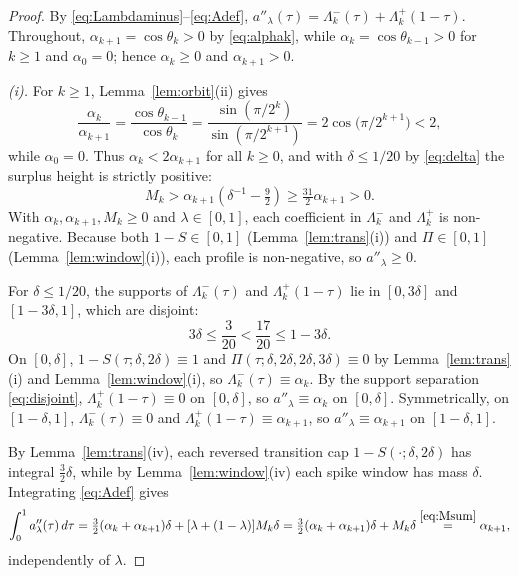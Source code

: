 \documentclass[11pt]{article}
\begin{document}
\begin{proof}
By \eqref{eq:Lambdaminus}--\eqref{eq:Adef}, $a''_\lambda(\tau)=\Lambda_k^-(\tau) + \Lambda_k^+(1-\tau)$. Throughout, $\alpha_{k+1}=\cos\theta_k>0$ by \eqref{eq:alphak}, while $\alpha_k=\cos\theta_{k-1}>0$ for $k\ge1$ and $\alpha_0=0$; hence $\alpha_k\ge0$ and $\alpha_{k+1}>0$.

\emph{(i).} For $k\ge1$, Lemma~\ref{lem:orbit}(ii) gives
\begin{equation}
\label{eq:rk}
\frac{\alpha_k}{\alpha_{k+1}} = \frac{\cos\theta_{k-1}}{\cos\theta_k}
= \frac{\sin(\pi/2^k)}{\sin(\pi/2^{k+1})}
= 2\cos\bigl(\pi/2^{k+1}\bigr) < 2,
\end{equation}
while $\alpha_0=0$. Thus $\alpha_k<2\alpha_{k+1}$ for all $k\ge0$, and with $\delta \le 1/20$ by \eqref{eq:delta} the surplus height is strictly positive:
\[
M_k > \alpha_{k+1}(\delta^{-1} - \tfrac92) \ge \tfrac{31}{2}\alpha_{k+1} > 0.
\]
With $\alpha_k, \alpha_{k+1}, M_k \ge 0$ and $\lambda \in [0, 1]$, each coefficient in $\Lambda_k^-$ and $\Lambda_k^+$ is non-negative. Because both $1-S \in [0, 1]$ (Lemma~\ref{lem:trans}(i)) and $\Pi \in [0, 1]$ (Lemma~\ref{lem:window}(i)), each profile is non-negative, so $a''_\lambda \ge 0$.

For $\delta\le 1/20$, the supports of $\Lambda_k^-(\tau)$ and $\Lambda_k^+(1-\tau)$ lie in $[0,3\delta]$ and $[1-3\delta,1]$, which are disjoint:
\begin{equation}
\label{eq:disjoint}
3\delta \le \frac{3}{20} < \frac{17}{20} \le 1-3\delta.
\end{equation}
On $[0, \delta]$, $1-S(\tau; \delta, 2\delta) \equiv 1$ and $\Pi(\tau; \delta, 2\delta, 2\delta, 3\delta) \equiv 0$ by Lemma~\ref{lem:trans}(i) and Lemma~\ref{lem:window}(i), so $\Lambda_k^-(\tau) \equiv \alpha_k$. By the support separation \eqref{eq:disjoint}, $\Lambda_k^+(1-\tau) \equiv 0$ on $[0, \delta]$, so $a''_\lambda \equiv \alpha_k$ on $[0, \delta]$. Symmetrically, on $[1-\delta, 1]$, $\Lambda_k^-(\tau) \equiv 0$ and $\Lambda_k^+(1-\tau) \equiv \alpha_{k+1}$, so $a''_\lambda \equiv \alpha_{k+1}$ on $[1-\delta, 1]$.

By Lemma~\ref{lem:trans}(iv), each reversed transition cap $1-S(\cdot; \delta, 2\delta)$ has integral $\frac32\delta$, while by Lemma~\ref{lem:window}(iv) each spike window has mass $\delta$.
Integrating \eqref{eq:Adef} gives
\begin{equation}
\label{eq:target}
\int_0^1 a''_\lambda(\tau)\,d\tau = \tfrac32(\alpha_k + \alpha_{k+1})\delta + [\lambda + (1-\lambda)]M_k\delta = \tfrac32(\alpha_k + \alpha_{k+1})\delta + M_k\delta \overset{\eqref{eq:Msum}}{=} \alpha_{k+1},
\end{equation}
independently of $\lambda$.


\end{proof}
\end{document}
